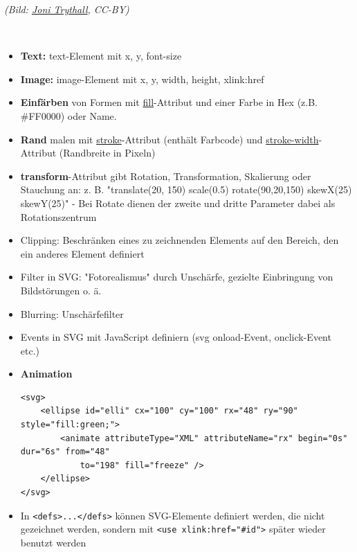 \documentclass[12pt,landscape]{article}
\begin{document}
\begin{multicols}{3}
\begin{center}
\tiny{\textit{(Bild: \href{https://www.sitepoint.com/closer-look-svg-path-data/}{Joni Trythall}, CC-BY)}}
\end{center}\\
\begin{itemize}
\item \textbf{Text:} text-Element mit x, y, font-size
\item \textbf{Image:} image-Element mit x, y, width, height, xlink:href
\item \textbf{Einfärben} von Formen mit \underline{fill}-Attribut und einer Farbe in Hex (z.B. \#FF0000) oder Name.
\item \textbf{Rand} malen mit \underline{stroke}-Attribut (enthält Farbcode) und \underline{stroke-width}-Attribut (Randbreite in Pixeln)
\item \textbf{transform}-Attribut gibt Rotation, Transformation, Skalierung oder Stauchung an: z. B. "translate(20, 150) scale(0.5) rotate(90,20,150) skewX(25) skewY(25)" - Bei Rotate dienen der zweite und dritte Parameter dabei als Rotationszentrum
\item Clipping: Beschränken eines zu zeichnenden Elements auf den Bereich, den ein anderes Element definiert
\item Filter in SVG: "Fotorealismus" durch Unschärfe, gezielte Einbringung von Bildstörungen o. ä.
\item Blurring: Unschärfefilter
\item Events in SVG mit JavaScript definiern (svg onload-Event, onclick-Event etc.)
\item \textbf{Animation} \begin{lstlisting}
<svg>
    <ellipse id="elli" cx="100" cy="100" rx="48" ry="90" style="fill:green;">
        <animate attributeType="XML" attributeName="rx" begin="0s" dur="6s" from="48"
            to="198" fill="freeze" />
    </ellipse>
</svg> 
\end{lstlisting}
\item In \lstinline|<defs>...</defs>| können SVG-Elemente definiert werden, die nicht gezeichnet werden, sondern mit \lstinline|<use xlink:href="#id">| später wieder benutzt werden
\end{itemize}

\end{multicols}
\end{document}
